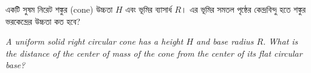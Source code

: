\documentclass[12pt, a4paper]{article}
\begin{document}
\newpage

\begin{tcolorbox}[questionbox={প্রশ্ন (Question) 32}]
    \noindent
    একটি সুষম নিরেট শঙ্কুর (cone) উচ্চতা $H$ এবং ভূমির ব্যাসার্ধ $R$। এর ভূমির সমতল পৃষ্ঠের কেন্দ্রবিন্দু হতে শঙ্কুর ভরকেন্দ্রের উচ্চতা কত হবে?
    
    \vspace{0.8em}
    \begin{english}
    \noindent\textit{\color{darkgray}
    A uniform solid right circular cone has a height $H$ and base radius $R$. What is the distance of the center of mass of the cone from the center of its flat circular base?
    }
    \end{english}
\end{tcolorbox}
\end{document}

